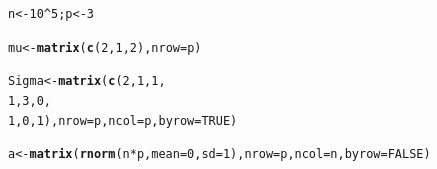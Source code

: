 \documentclass[11pt, a4paper]{article}\usepackage[]{graphicx}\usepackage[]{xcolor}
\makeatletter
\newcommand{\hlnum}[1]{\textcolor[rgb]{0.686,0.059,0.569}{#1}}%
\newcommand{\hlopt}[1]{\textcolor[rgb]{0,0,0}{#1}}%
\newcommand{\hldef}[1]{\textcolor[rgb]{0.345,0.345,0.345}{#1}}%
\newcommand{\hlkwb}[1]{\textcolor[rgb]{0.69,0.353,0.396}{#1}}%
\newcommand{\hlkwc}[1]{\textcolor[rgb]{0.333,0.667,0.333}{#1}}%
\newcommand{\hlkwd}[1]{\textcolor[rgb]{0.737,0.353,0.396}{\textbf{#1}}}%
\newenvironment{kframe}{%
 \def\at@end@of@kframe{}%
 \ifinner\ifhmode%
  \def\at@end@of@kframe{\end{minipage}}%
  \begin{minipage}{\columnwidth}%
 \fi\fi%
 \def\FrameCommand##1{\hskip\@totalleftmargin \hskip-\fboxsep
 \colorbox{shadecolor}{##1}\hskip-\fboxsep
     \hskip-\linewidth \hskip-\@totalleftmargin \hskip\columnwidth}%
 \MakeFramed {\advance\hsize-\width
   \@totalleftmargin\z@ \linewidth\hsize
   \@setminipage}}%
 {\par\unskip\endMakeFramed%
 \at@end@of@kframe}
\newenvironment{knitrout}{}{} %
\makeatother
\begin{document}
\begin{knitrout}
\color{fgcolor}\begin{kframe}
\begin{alltt}
\hldef{n} \hlkwb{<-} \hlnum{10}\hlopt{^}\hlnum{5}\hldef{; p} \hlkwb{<-} \hlnum{3}
\end{alltt}
\end{kframe}
\end{knitrout}

\begin{knitrout}
\color{fgcolor}\begin{kframe}
\begin{alltt}
\hldef{mu} \hlkwb{<-} \hlkwd{matrix}\hldef{(}\hlkwd{c}\hldef{(}\hlnum{2}\hldef{,} \hlnum{1}\hldef{,} \hlnum{2}\hldef{),} \hlkwc{nrow} \hldef{= p)}
\end{alltt}
\end{kframe}
\end{knitrout}

\begin{knitrout}
\color{fgcolor}\begin{kframe}
\begin{alltt}
\hldef{Sigma} \hlkwb{<-} \hlkwd{matrix}\hldef{(}\hlkwd{c}\hldef{(}\hlnum{2}\hldef{,} \hlnum{1}\hldef{,} \hlnum{1}\hldef{,}
                  \hlnum{1}\hldef{,} \hlnum{3}\hldef{,} \hlnum{0}\hldef{,}
                  \hlnum{1}\hldef{,} \hlnum{0}\hldef{,} \hlnum{1}\hldef{),} \hlkwc{nrow} \hldef{= p,} \hlkwc{ncol} \hldef{= p,} \hlkwc{byrow} \hldef{=} \hlnum{TRUE}\hldef{)}
\end{alltt}
\end{kframe}
\end{knitrout}

\begin{knitrout}
\color{fgcolor}\begin{kframe}
\begin{alltt}
\hldef{a} \hlkwb{<-} \hlkwd{matrix}\hldef{(}\hlkwd{rnorm}\hldef{(n} \hlopt{*} \hldef{p,} \hlkwc{mean} \hldef{=} \hlnum{0}\hldef{,} \hlkwc{sd} \hldef{=} \hlnum{1}\hldef{),} \hlkwc{nrow} \hldef{= p,} \hlkwc{ncol} \hldef{= n,} \hlkwc{byrow} \hldef{=} \hlnum{FALSE}\hldef{)}
\end{alltt}
\end{kframe}
\end{knitrout}
\end{document}
